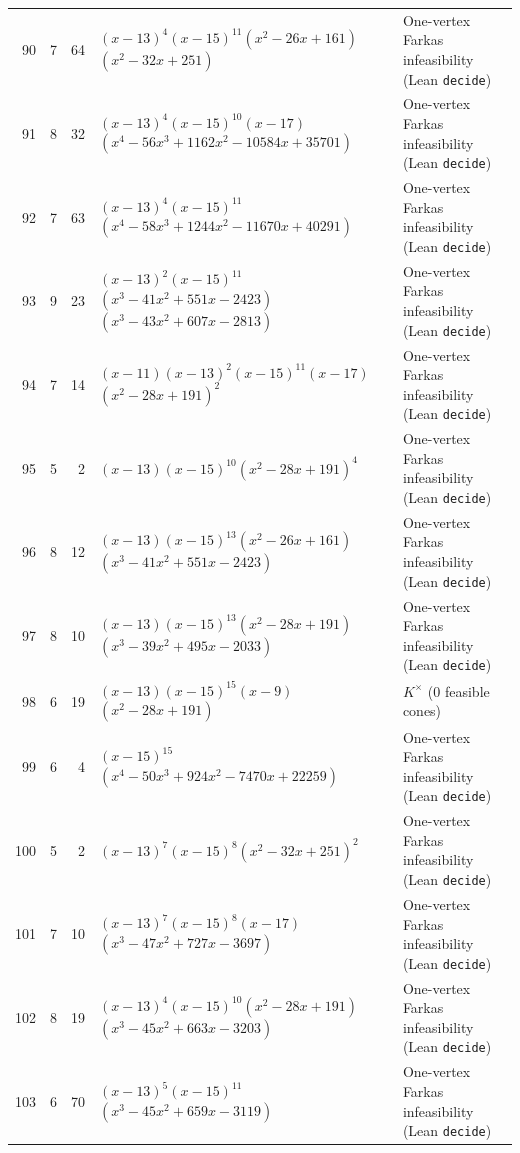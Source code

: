 \documentclass[11pt,reqno]{amsart}
\theoremstyle{definition}
\theoremstyle{remark}
\numberwithin{equation}{section}
\numberwithin{table}{section}
\begin{document}
{\begin{longtable}{@{}rrr>{\raggedright\arraybackslash}p{2.50in}>{\raggedright\arraybackslash}p{2.30in}@{}}
90 & 7 & 64 & $(x-13)^4$\allowbreak $(x-15)^{11}$\allowbreak $(x^2-26x+161)$\allowbreak $(x^2-32x+251)$ & One-vertex Farkas infeasibility (Lean \texttt{decide}) \\
91 & 8 & 32 & $(x-13)^4$\allowbreak $(x-15)^{10}$\allowbreak $(x-17)$\allowbreak $(x^4-56x^3+1162x^2-10584x+35701)$ & One-vertex Farkas infeasibility (Lean \texttt{decide}) \\
92 & 7 & 63 & $(x-13)^4$\allowbreak $(x-15)^{11}$\allowbreak $(x^4-58x^3+1244x^2-11670x+40291)$ & One-vertex Farkas infeasibility (Lean \texttt{decide}) \\
93 & 9 & 23 & $(x-13)^2$\allowbreak $(x-15)^{11}$\allowbreak $(x^3-41x^2+551x-2423)$\allowbreak $(x^3-43x^2+607x-2813)$ & One-vertex Farkas infeasibility (Lean \texttt{decide}) \\
94 & 7 & 14 & $(x-11)$\allowbreak $(x-13)^2$\allowbreak $(x-15)^{11}$\allowbreak $(x-17)$\allowbreak $(x^2-28x+191)^2$ & One-vertex Farkas infeasibility (Lean \texttt{decide}) \\
95 & 5 & 2 & $(x-13)$\allowbreak $(x-15)^{10}$\allowbreak $(x^2-28x+191)^4$ & One-vertex Farkas infeasibility (Lean \texttt{decide}) \\
96 & 8 & 12 & $(x-13)$\allowbreak $(x-15)^{13}$\allowbreak $(x^2-26x+161)$\allowbreak $(x^3-41x^2+551x-2423)$ & One-vertex Farkas infeasibility (Lean \texttt{decide}) \\
97 & 8 & 10 & $(x-13)$\allowbreak $(x-15)^{13}$\allowbreak $(x^2-28x+191)$\allowbreak $(x^3-39x^2+495x-2033)$ & One-vertex Farkas infeasibility (Lean \texttt{decide}) \\
98 & 6 & 19 & $(x-13)$\allowbreak $(x-15)^{15}$\allowbreak $(x-9)$\allowbreak $(x^2-28x+191)$ & $K^\times$ ($0$ feasible cones) \\
99 & 6 & 4 & $(x-15)^{15}$\allowbreak $(x^4-50x^3+924x^2-7470x+22259)$ & One-vertex Farkas infeasibility (Lean \texttt{decide}) \\
100 & 5 & 2 & $(x-13)^7$\allowbreak $(x-15)^8$\allowbreak $(x^2-32x+251)^2$ & One-vertex Farkas infeasibility (Lean \texttt{decide}) \\
101 & 7 & 10 & $(x-13)^7$\allowbreak $(x-15)^8$\allowbreak $(x-17)$\allowbreak $(x^3-47x^2+727x-3697)$ & One-vertex Farkas infeasibility (Lean \texttt{decide}) \\
102 & 8 & 19 & $(x-13)^4$\allowbreak $(x-15)^{10}$\allowbreak $(x^2-28x+191)$\allowbreak $(x^3-45x^2+663x-3203)$ & One-vertex Farkas infeasibility (Lean \texttt{decide}) \\
103 & 6 & 70 & $(x-13)^5$\allowbreak $(x-15)^{11}$\allowbreak $(x^3-45x^2+659x-3119)$ & One-vertex Farkas infeasibility (Lean \texttt{decide}) \\

\end{longtable}}
\end{document}
